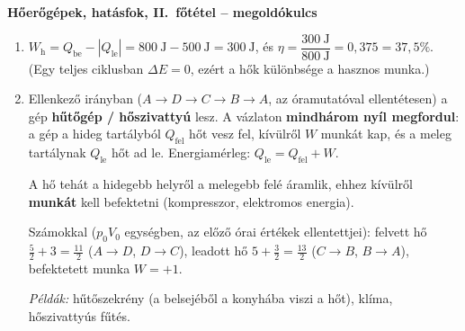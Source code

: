 \documentclass[11pt,a4paper]{article}
\begin{document}
\begin{center}
  {\large\bfseries Hőerőgépek, hatásfok, II.~főtétel -- megoldókulcs}\\[3pt]
\end{center}

\begin{enumerate}
\item $W_\text{h} = Q_\text{be} - |Q_\text{le}| = 800~\text{J} - 500~\text{J} = 300~\text{J}$,
  és $\eta = \dfrac{300~\text{J}}{800~\text{J}} = 0{,}375 = 37{,}5\%$.
  (Egy teljes ciklusban $\Delta E = 0$, ezért a hők különbsége a hasznos munka.)

\item
\begin{minipage}[t]{0.66\linewidth}
  Ellenkező irányban ($A\to D\to C\to B\to A$, az óramutatóval ellentétesen) a gép
  \textbf{hűtőgép / hőszivattyú} lesz. A vázlaton \textbf{mindhárom nyíl megfordul}:
  a gép a hideg tartályból $Q_\text{fel}$ hőt vesz fel, kívülről $W$ munkát kap, és a meleg
  tartálynak $Q_\text{le}$ hőt ad le. Energiamérleg: $Q_\text{le} = Q_\text{fel} + W$.

  A hő tehát a hidegebb helyről a melegebb felé áramlik, ehhez kívülről \textbf{munkát}
  kell befektetni (kompresszor, elektromos energia).

  Számokkal ($p_0V_0$ egységben, az előző órai értékek ellentettjei): felvett hő
  $\tfrac52 + 3 = \tfrac{11}{2}$ ($A\to D$, $D\to C$), leadott hő $5 + \tfrac32 =
  \tfrac{13}{2}$ ($C\to B$, $B\to A$), befektetett munka $W = +1$.

  \emph{Példák:} hűtőszekrény (a belsejéből a konyhába viszi a hőt), klíma,
  hőszivattyús fűtés.
\end{minipage}\hfill
\begin{minipage}[t]{0.30\linewidth}\vspace{0pt}\centering
\end{minipage}


\end{enumerate}
\end{document}
